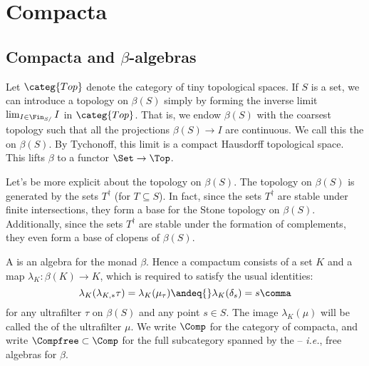 
\section{Compacta}%
\label{sec:compacta}

\subsection{Compacta and $ \beta $-algebras}%
\label{sub:compacta_and_beta_algebras}

\begin{construction}
	Let $ \categ{Top} $ denote the category of tiny topological spaces.
	If $ S $ is a set, we can introduce a topology on $ \beta(S) $ simply by forming the inverse limit $ \lim_{I \in \Fin_{S/}} I $ in $ \categ{Top} $.
	That is, we endow $ \beta(S) $ with the coarsest topology such that all the projections $ \beta(S) \to I $ are continuous.
	We call this the  on $\beta(S)$.
	By Tychonoff, this limit is a compact Hausdorff topological space.
	This lifts $ \beta $ to a functor $ \Set \to \Top $.
\end{construction}

\begin{nul}
	Let's be more explicit about the topology on $ \beta(S) $.
	The topology on $ \beta(S) $ is generated by the sets $ T^{\dag} $ (for $ T \subseteq S $).
	In fact, since the sets $ T^{\dag} $ are stable under finite intersections, they form a base for the Stone topology on $ \beta(S) $.
	Additionally, since the sets $ T^{\dag} $ are stable under the formation of complements, they even form a base of clopens of $ \beta(S) $.
\end{nul}

\begin{definition} \label{compactaasbetaalgebras}
	A  is an algebra for the monad $ \beta $.
	Hence a compactum consists of a set $ K $ and a map $ \lambda_K \colon \beta(K) \to K $, which is required to satisfy the usual identities:
	\[
		\lambda_K(\lambda_{K,\ast}\tau) = \lambda_K(\mu_{\tau}) \andeq{} \lambda_K(\delta_s) = s \comma
	\]
	for any ultrafilter $ \tau $ on $ \beta(S) $ and any point $ s \in S $.
	The image $ \lambda_K(\mu) $ will be called the  of the ultrafilter $\mu$.
	We write $ \Comp $ for the category of compacta, and write $\Compfree \subset \Comp $ for the full subcategory spanned by the  -- \emph{i.e.}, free algebras for $ \beta $.
\end{definition}

